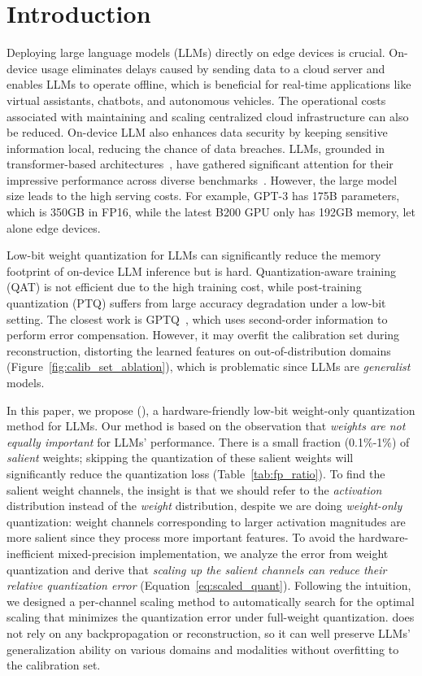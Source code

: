 \section{Introduction}


Deploying large language models (LLMs) directly on edge devices is crucial. On-device usage eliminates delays caused by sending data to a cloud server and enables LLMs to operate offline, which is beneficial for real-time applications like virtual assistants, chatbots, and autonomous vehicles. The operational costs associated with maintaining and scaling centralized cloud infrastructure can also be reduced. On-device LLM also enhances data security by keeping sensitive information local, reducing the chance of data breaches. LLMs, grounded in transformer-based architectures~\cite{vaswani2017attention}, have gathered significant attention for their impressive performance across diverse benchmarks~\cite{gpt3, opt, touvron2023llama, scao2022bloom}. However, the large model size leads to the high serving costs. For example, GPT-3 has 175B parameters, which is 350GB in FP16, while the latest B200 GPU only has 192GB memory, let alone edge devices.


Low-bit weight quantization for LLMs can significantly reduce the memory footprint of on-device LLM inference but is hard.
Quantization-aware training (QAT) is not efficient due to the high training cost, while post-training quantization (PTQ) suffers from large accuracy degradation under a low-bit setting. The closest work is GPTQ~\cite{frantar2022gptq}, which uses second-order information to perform error compensation. 
However, it may overfit the calibration set during reconstruction, distorting the learned features on out-of-distribution domains (Figure~\ref{fig:calib_set_ablation}), which is problematic since LLMs are \emph{generalist} models. 

In this paper, we propose  \method (\methodshort), a hardware-friendly low-bit weight-only quantization method for LLMs. Our method is based on the observation that \emph{weights are not equally important} for LLMs' performance. There is a small fraction (0.1\%-1\%) of \emph{salient} weights; skipping the quantization of these salient weights will significantly reduce the quantization loss (Table~\ref{tab:fp_ratio}). To find the salient weight channels, the insight is that we should refer to the \emph{activation} distribution instead of the \emph{weight} distribution, despite we are doing \emph{weight-only} quantization: weight channels corresponding to larger activation magnitudes are more salient since they process more important features. 
To avoid the hardware-inefficient mixed-precision implementation, we analyze the error from weight quantization and derive that \emph{scaling up the salient channels can reduce their relative quantization error} (Equation~\ref{eq:scaled_quant}). Following the intuition, we designed a per-channel scaling method to automatically search for the optimal scaling that minimizes the quantization error under full-weight quantization.
\methodshort does not rely on any backpropagation or reconstruction, so it can well preserve LLMs’ generalization ability on various domains and modalities without overfitting to the calibration set. 

